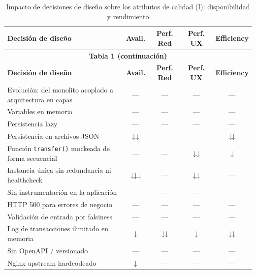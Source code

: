 \begingroup
\renewcommand*{\arraystretch}{1.2}
\setlength{\tabcolsep}{4pt}
\begin{longtable}{@{}l|c|c|c|c@{}}
\caption{Impacto de decisiones de diseño sobre los atributos de calidad (I): disponibilidad y rendimiento}\\
\toprule
\textbf{Decisión de diseño} & \textbf{Avail.} & \textbf{Perf. Red} & \textbf{Perf. UX} & \textbf{Efficiency} \\
\midrule
\endfirsthead
\multicolumn{5}{c}{{\bfseries Tabla 1 (continuación)}} \\
\toprule
\textbf{Decisión de diseño} & \textbf{Avail.} & \textbf{Perf. Red} & \textbf{Perf. UX} & \textbf{Efficiency} \\
\midrule
\endhead
\bottomrule
\endfoot
Evolución: del monolito acoplado a arquitectura en capas & — & — & — & — \\
Variables en memoria & — & — & — & — \\
Persistencia lazy & — & — & — & — \\
Persistencia en archivos JSON & ↓↓ & — & — & ↓↓ \\
Función \texttt{transfer()} mockeada de forma secuencial & — & — & ↓↓ & ↓ \\
Instancia única sin redundancia ni healthcheck & ↓↓↓ & — & ↓↓ & — \\
Sin instrumentación en la aplicación & — & — & — & — \\
HTTP 500 para errores de negocio & — & — & — & — \\
Validación de entrada por falsiness & — & — & — & — \\
Log de transacciones ilimitado en memoria & ↓ & ↓↓ & ↓ & ↓↓ \\
Sin OpenAPI / versionado & — & — & — & — \\
Nginx upstream hardcodeado & ↓ & — & — & — \\
\end{longtable}
\endgroup

\vspace{0.8cm}


